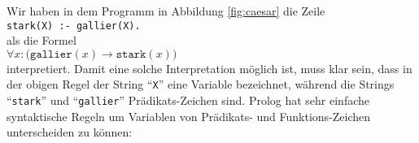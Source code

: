 \noindent
Wir haben in dem Programm in Abbildung \ref{fig:caesar} die Zeile \\[0.2cm]
\hspace*{1.3cm} \texttt{stark(X) :- gallier(X).} \\[0.2cm]
als die Formel \\[0.2cm]
\hspace*{1.3cm} $\forall x \colon \bigl(\texttt{gallier}(x) \rightarrow \texttt{stark}(x)\bigr)$ \\[0.2cm]
interpretiert.  Damit eine solche Interpretation m\"{o}glich ist, muss klar sein,
dass in der obigen Regel der String ``\texttt{X}'' eine Variable bezeichnet,
w\"{a}hrend die Strings ``\texttt{stark}'' und ``\texttt{gallier}'' Pr\"{a}dikats-Zeichen sind. 
Prolog hat sehr einfache syntaktische Regeln um Variablen von Pr\"{a}dikats- und Funktions-Zeichen
unterscheiden zu k\"{o}nnen:
